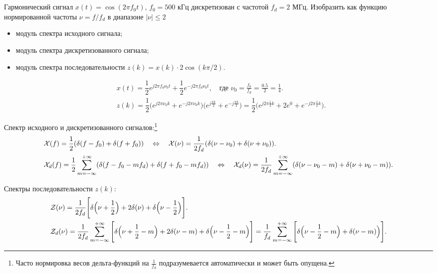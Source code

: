 \protect\thispagestyle{fancy}
\section{}
Гармонический сигнал $x(t) = \cos(2 \pi f_0 t)$, $f_0 = 500$ кГц дискретизован с частотой $f_{d} = 2$ МГц. Изобразить как функцию нормированной частоты $\nu = f/f_{d}$ в диапазоне $|\nu|\leq2$ 
\begin{itemize}
	\item модуль спектра исходного сигнала;
	\item модуль спектра дискретизованного сигнала;
	\item модуль спектра последовательности $z(k) = x(k)\cdot 2\cos(k \pi /2)$.
\end{itemize}


\begin{align*}
	&x(t) = \dfrac{1}{2}e^{j 2 \pi f_d \nu_0 t} + \dfrac{1}{2}e^{-j 2 \pi f_d \nu_0 t},\quad \text{где }\nu_0 = \frac{f_0}{f_d} = \frac{0.5}{2} = \frac{1}{4}.\\
	&z(k) = \dfrac{1}{2}\Big(e^{j 2 \pi \nu_0 k} + e^{-j 2 \pi \nu_0 k}\Big)
	\Big(e^{j \frac{\pi k}{2}} + e^{-j \frac{\pi k}{2}}\Big) =  
	\dfrac{1}{2}\Big(e^{j 2 \pi \frac{1}{2} k} + 2e^{0} + e^{-j 2 \pi \frac{1}{2} k} \Big).
\end{align*}

Спектр исходного и дискретизованного сигналов:\footnote[1]{Часто нормировка весов дельта-функций на $\frac{1}{f_d}$ подразумевается автоматически и может быть опущена.}
\begin{align*}
	&\mathcal{X}(f) = \dfrac{1}{2}(\delta(f-f_0)+\delta(f+f_0))
	\quad \Leftrightarrow \quad
	\mathcal{X}(\nu) = \dfrac{1}{2f_d}(\delta(\nu-\nu_0) + \delta(\nu+\nu_0)).\\
	&\mathcal{X}_d(f) = \dfrac{1}{2}\sum\limits_{m=-\infty}^{+\infty}(\delta(f-f_0-mf_d)+\delta(f+f_0-mf_d)) \quad \Leftrightarrow \quad
	\mathcal{X}_d(\nu) = \dfrac{1}{2f_d}\sum\limits_{m=-\infty}^{+\infty}(\delta(\nu-\nu_0-m)+\delta(\nu+\nu_0-m)).
\end{align*}

Спектры последовательности $z(k)$:
\begin{align*}
	&\mathcal{Z}(\nu) = \dfrac{1}{2f_d}\Bigg[\delta\Big(\nu+\frac{1}{2}\Big) + 2\delta(\nu) + \delta\Big(\nu-\frac{1}{2}\Big)\Bigg].\\
	&\mathcal{Z}_{d}(\nu) = \dfrac{1}{2f_d}\sum\limits_{m=-\infty}^{+\infty}\Bigg[\delta\Big(\nu+\frac{1}{2}-m\Big) +2\delta(\nu-m) + \delta\Big(\nu-\frac{1}{2}-m\Big)\Bigg] =
	\dfrac{1}{f_d}\sum\limits_{m=-\infty}^{+\infty} \Bigg[\delta\Big(\nu-\frac{1}{2}-m\Big) +\delta(\nu-m)\Big)\Bigg].
\end{align*}

